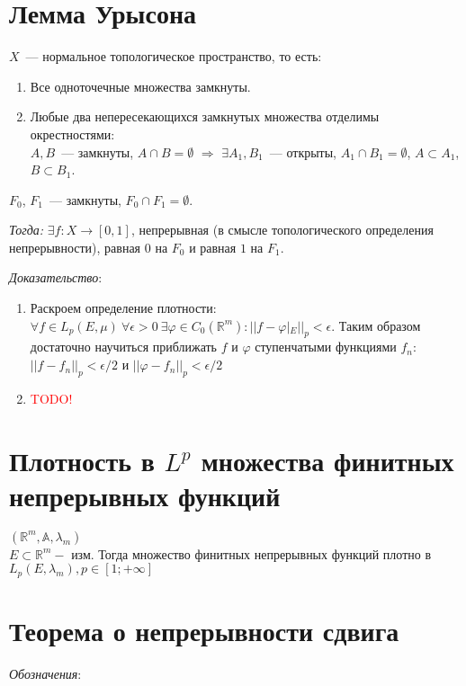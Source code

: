 \documentclass[paper=a4, fontsize=14pt]{report}
\begin{document}
    \section{Лемма Урысона}
    $X$~--- нормальное топологическое пространство, то есть:
    \begin{enumerate}
        \item Все одноточечные множества замкнуты.
        \item Любые два непересекающихся замкнутых множества отделимы окрестностями:\\
        $A,B$~--- замкнуты, $A \cap B = \emptyset$ $\Rightarrow$ $\exists A_1,B_1$~--- открыты, $A_1 \cap B_1 = \emptyset$,
        $A \subset A_1$, $B \subset B_1$.
    \end{enumerate}

    $F_0$, $F_1$~--- замкнуты, $F_0 \cap F_1 = \emptyset$.

    \emph{Тогда:} $\exists f: X \rightarrow [0,1]$, непрерывная (в смысле топологического определения непрерывности), равная $0$ на $F_0$ и равная $1$ на $F_1$.
    
    
    \emph{Доказательство}:

\begin{enumerate}
	\item  Раскроем определение плотности: $\forall f \in L_p(E, \mu) \ \forall \epsilon > 0 \ \exists \varphi \in C_0(\mathbb{R}^m): ||f - \varphi|_E ||_p < \epsilon$. Таким образом достаточно научиться приближать $f$ и  $\varphi$ ступенчатыми функциями $f_n$: $||f-f_n||_p < \epsilon /2 $ и $||\varphi-f_n||_p < \epsilon /2 $

	\item	 \textcolor{red}{TODO!}

\end{enumerate}


    \section{Плотность в $L^p$ множества финитных непрерывных функций}
    $(\mathbb{R}^m, \mathbb{A}, \lambda_m)$\\

    $E \subset \mathbb{R}^m -$ изм. Тогда множество финитных непрерывных функций плотно в $L_p(E, \lambda_m), p \in [1; +\infty]$\\

    \section{Теорема о непрерывности сдвига}
    \emph{Обозначения}:
\end{document}
